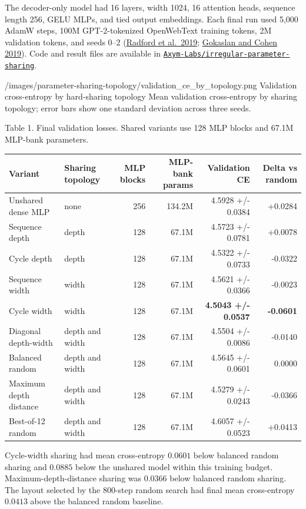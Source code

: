 \documentclass[11pt]{article}
\begin{document}
The decoder-only model had 16 layers, width 1024, 16 attention heads, sequence length 256, GELU MLPs, and tied output embeddings. Each final run used 5,000 AdamW steps, 100M GPT-2-tokenized OpenWebText training tokens, 2M validation tokens, and seeds 0--2 (\href{https://cdn.openai.com/better-language-models/language_models_are_unsupervised_multitask_learners.pdf}{Radford et al.~2019}; \href{https://skylion007.github.io/OpenWebTextCorpus/}{Gokaslan and Cohen 2019}). Code and result files are available in \href{https://github.com/Axym-Labs/irregular-parameter-sharing}{\texttt{Axym-Labs/irregular-parameter-sharing}}.

  {/images/parameter-sharing-topology/validation_ce_by_topology.png}
  {Validation cross-entropy by hard-sharing topology}
  {Mean validation cross-entropy by sharing topology; error bars show one standard deviation across three seeds.}

Table 1. Final validation losses. Shared variants use 128 MLP blocks and 67.1M MLP-bank parameters.

\begin{tabular}{@{}llrrrr@{}}
\toprule
Variant & Sharing topology & MLP blocks & MLP-bank params & Validation CE & Delta vs random \\
\midrule
Unshared dense MLP & none & 256 & 134.2M & 4.5928 +/- 0.0384 & +0.0284 \\
Sequence depth & depth & 128 & 67.1M & 4.5723 +/- 0.0781 & +0.0078 \\
Cycle depth & depth & 128 & 67.1M & 4.5322 +/- 0.0733 & -0.0322 \\
Sequence width & width & 128 & 67.1M & 4.5621 +/- 0.0366 & -0.0023 \\
Cycle width & width & 128 & 67.1M & \textbf{4.5043 +/- 0.0537} & \textbf{-0.0601} \\
Diagonal depth-width & depth and width & 128 & 67.1M & 4.5504 +/- 0.0086 & -0.0140 \\
Balanced random & depth and width & 128 & 67.1M & 4.5645 +/- 0.0601 & 0.0000 \\
Maximum depth distance & depth and width & 128 & 67.1M & 4.5279 +/- 0.0243 & -0.0366 \\
Best-of-12 random & depth and width & 128 & 67.1M & 4.6057 +/- 0.0523 & +0.0413 \\
\bottomrule
\end{tabular}

Cycle-width sharing had mean cross-entropy \(0.0601\) below balanced random sharing and \(0.0885\) below the unshared model within this training budget. Maximum-depth-distance sharing was \(0.0366\) below balanced random sharing. The layout selected by the 800-step random search had final mean cross-entropy \(0.0413\) above the balanced random baseline.
\end{document}
